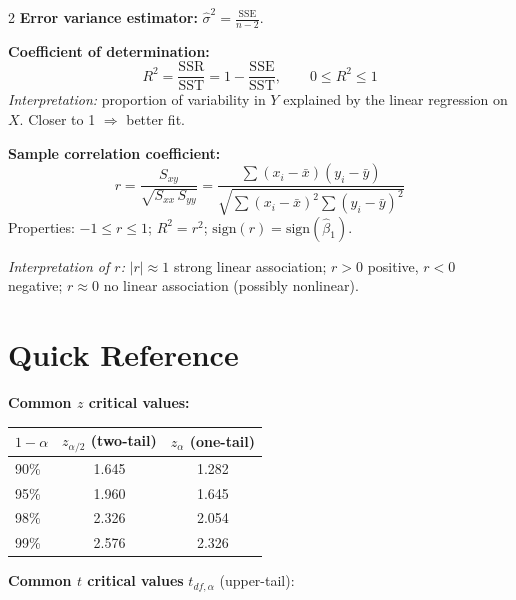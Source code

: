 \documentclass[9pt,a4paper]{extarticle}
\renewcommand{\arraystretch}{1.1}
\newcommand{\sh}[1]{\textbf{\color{BrickRed} #1}}
\begin{document}
\begin{multicols*}{2}
\sh{Error variance estimator:} $\displaystyle \hat{\sigma}^{2}=\frac{\mathrm{SSE}}{n-2}$.

\sh{Coefficient of determination:}
\[
R^{2}=\frac{\mathrm{SSR}}{\mathrm{SST}}=1-\frac{\mathrm{SSE}}{\mathrm{SST}},\qquad 0\le R^{2}\le 1
\]
\textit{Interpretation:} proportion of variability in $Y$ explained by the linear regression on $X$. Closer to 1 $\Rightarrow$ better fit.

\sh{Sample correlation coefficient:}
\[
r=\frac{S_{xy}}{\sqrt{S_{xx}\,S_{yy}}}=\frac{\sum(x_i-\bar{x})(y_i-\bar{y})}{\sqrt{\sum(x_i-\bar{x})^{2}\sum(y_i-\bar{y})^{2}}}
\]
Properties: $-1\le r\le 1$; $R^{2}=r^{2}$; $\mathrm{sign}(r)=\mathrm{sign}(\hat{\beta}_1)$.

\textit{Interpretation of $r$:} $|r|\!\approx\!1$ strong linear association; $r\!>\!0$ positive, $r\!<\!0$ negative; $r\!\approx\!0$ no linear association (possibly nonlinear).

\section{Quick Reference}

\sh{Common $z$ critical values:}

\begin{center}\small
\renewcommand{\arraystretch}{1.1}
\begin{tabular}{@{}lcc@{}}
\toprule
$1-\alpha$ & $z_{\alpha/2}$ (two-tail) & $z_{\alpha}$ (one-tail) \\
\midrule
90\% & 1.645 & 1.282 \\
95\% & 1.960 & 1.645 \\
98\% & 2.326 & 2.054 \\
99\% & 2.576 & 2.326 \\
\bottomrule
\end{tabular}
\end{center}

\sh{Common $t$ critical values} $t_{df,\alpha}$ (upper-tail):


\end{multicols*}
\end{document}
